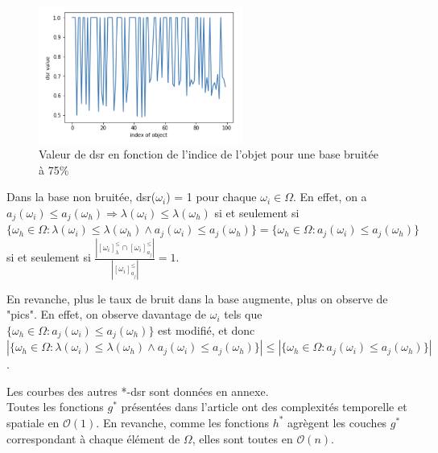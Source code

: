 \documentclass[a4paper]{article}
\begin{document}
\begin{figure}[H]
	\center 
	\includegraphics[width=0.6\textwidth]{images/dsr_75.png}
    \caption{Valeur de dsr en fonction de l'indice de l'objet pour une base
    bruitée à 75\%}
    \label{img:dsr75}
\end{figure}


Dans la base non bruitée, dsr($\omega_i$) = 1 pour chaque $\omega_i \in \Omega$.
En effet, on a $a_j(\omega_i) \leq a_j(\omega_h) \Rightarrow \lambda(\omega_i)
\leq \lambda(\omega_h)$ si et seulement si $\{\omega_h \in \Omega :
\lambda(\omega_i) \leq \lambda(\omega_h) \land a_j(\omega_i) \leq
a_j(\omega_h)\} = \{\omega_h \in \Omega : a_j(\omega_i) \leq a_j(\omega_h)\}$ si
et seulement si $\frac{| [\omega_i]^{\leq}_{\lambda} \cap
[\omega_i]^{\leq}_{a_j}|}{| [\omega_i]^{\leq}_{a_j} |} = 1 $.

\noindent En revanche, plus le taux de bruit dans la base augmente, plus on observe de
"pics". En effet, on observe davantage de $\omega_i$ tels que $ \{\omega_h \in
\Omega : a_j(\omega_i) \leq a_j(\omega_h)\} $ est modifié, et donc  $|
\{\omega_h \in \Omega : \lambda(\omega_i) \leq \lambda(\omega_h) \land
a_j(\omega_i) \leq a_j(\omega_h)\} | \leq | \{\omega_h \in \Omega :
a_j(\omega_i) \leq a_j(\omega_h)\} |$.

\noindent Les courbes des autres *-dsr sont données en annexe.\\

Toutes les fonctions $g^*$ présentées dans l'article ont des complexités
temporelle et spatiale en $\mathcal{O}(1)$. En revanche, comme les fonctions
$h^*$ agrègent les couches $g^*$ correspondant à chaque élément de $\Omega$,
elles sont toutes en $\mathcal{O}(n)$.   
\end{document}
